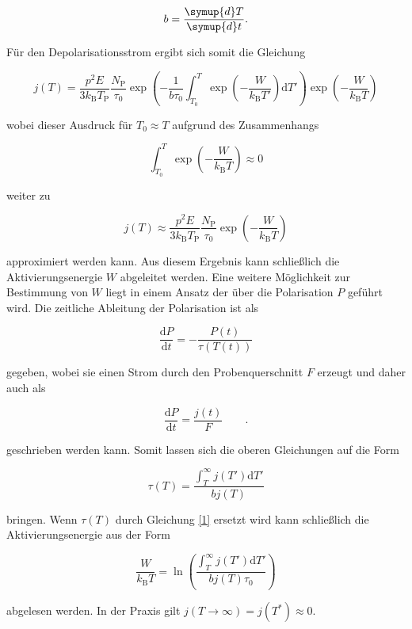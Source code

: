 \begin{equation}
    b = \frac{\symup{d}T}{\symup{d}t}.
\end{equation}

Für den Depolarisationsstrom ergibt sich somit die Gleichung 

\begin{equation}
    j(T) = \frac{ p^{2} E }{ 3 k_{\mathrm{B}} T_{\mathrm{P}} } \frac{ N_{\mathrm{P}} }{ \tau_{\text{0}} } \exp{ \left( - \frac{ 1 }{ b \tau_{\text{0}} } \int_{T_{\text{0}}}^T \exp{ \left( - \frac{ W }{ k_{\mathrm{B}} T' } \right) \mathrm{d}T' } \right) } \exp{ \left( -\frac{ W }{ k_{\mathrm{B}} T } \right) } 
\end{equation}

wobei dieser Ausdruck für $T_{\text{0}} \approx T$ aufgrund des 
Zusammenhangs

\begin{equation*}
    \int_{T_{\text{0}}}^T \exp{ \left( - \frac{ W }{ k_{\mathrm{B}} T } \right )} \approx 0  
\end{equation*}

weiter zu 

\begin{equation}
    j(T) \approx \frac{ p^{2} E }{ 3 k_{\mathrm{B}} T_{\mathrm{P} }} \frac{ N_{\mathrm{P}} }{ \tau_{\text{0}} } \exp{ \left( - \frac{ W }{ k_{\mathrm{B}} T} \right ) }
    \label{eq2}
\end{equation}

approximiert werden kann.
Aus diesem Ergebnis kann schließlich die Aktivierungsenergie $W$ abgeleitet werden.
Eine weitere Möglichkeit zur Bestimmung von $W$ liegt in einem Ansatz der über 
die Polarisation $P$ geführt wird.
Die zeitliche Ableitung der Polarisation ist als

\begin{equation*}
    \frac{\mathrm{d}P}{\mathrm{d}t} = - \frac{ P(t) }{ \tau(T(t))}
\end{equation*}

gegeben, wobei sie einen Strom durch den Probenquerschnitt $F$ erzeugt und daher auch als

\begin{equation*}
    \frac{\mathrm{d}P}{\mathrm{d}t} = \frac{j(t)}{F} \qquad.
\end{equation*}

geschrieben werden kann.
Somit lassen sich die oberen Gleichungen auf die Form 

\begin{equation*}
    \tau(T) = \frac{ \int_{T}^\infty j(T') \mathrm{d}T' }{ b j(T) } 
\end{equation*}

bringen. Wenn $\tau(T)$ durch Gleichung \eqref{1} ersetzt wird kann 
schließlich die Aktivierungsenergie aus der Form 

\begin{equation}
    \frac{ W }{ k_{\mathrm{B}} T } = \ln{ \left( \frac{ \int_{T}^\infty j(T') \mathrm{d}T' }{ b j(T) \tau_{\text{0}} } \right) }
    \label{eq3}
\end{equation}

abgelesen werden. In der Praxis gilt
$j(T \to \infty) = j(T^*)  \approx 0$.

\cite{sample}
